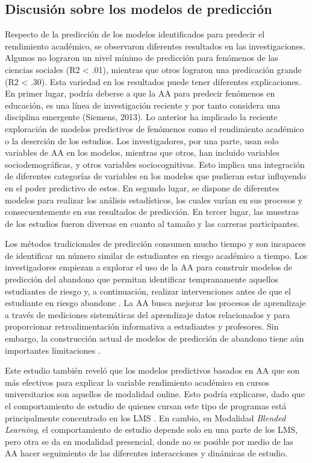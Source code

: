 \documentclass[spanish]{textolivre}
\begin{document}
\subsection*{Discusión sobre los modelos de predicción}
Respecto de la predicción de los modelos identificados para predecir el rendimiento académico, se observaron diferentes resultados en las investigaciones. Algunos no lograron un nivel mínimo de predicción para fenómenos de las ciencias sociales (R2 < .01), mientras que otros lograron una predicación grande (R2 < .30). Esta variedad en los resultados puede tener diferentes explicaciones. En primer lugar, podría deberse a que la AA para predecir fenómenos en educación, es una línea de investigación reciente y por tanto considera una disciplina emergente (Siemens, 2013). Lo anterior ha implicado la reciente exploración de modelos predictivos de fenómenos como el rendimiento académico o la deserción de los estudios. Los investigadores, por una parte, usan solo variables de AA en los modelos, mientras que otros, han incluido variables sociodemográficas, y otros variables sociocognitivas. Esto implica una integración de diferentes categorías de variables en los modelos que pudieran estar influyendo en el poder predictivo de estos. En segundo lugar, se dispone de diferentes modelos para realizar los análisis estadísticos, los cuales varían en sus procesos y consecuentemente en sus resultados de predicción. En tercer lugar, las muestras de los estudios fueron diversas en cuanto al tamaño y las carreras participantes.

Los métodos tradicionales de predicción consumen mucho tiempo y son incapaces de identificar un número similar de estudiantes en riesgo académico a tiempo. Los investigadores empiezan a explorar el uso de la AA para construir modelos de predicción del abandono que permitan identificar tempranamente aquellos estudiantes de riesgo y, a continuación, realizar intervenciones antes de que el estudiante en riesgo abandone \cite{zheng2020}. La AA busca mejorar los procesos de aprendizaje a través de mediciones sistemáticas del aprendizaje datos relacionados y para proporcionar retroalimentación informativa a estudiantes y profesores. Sin embargo, la construcción actual de modelos de predicción de abandono tiene aún importantes limitaciones \cite{zheng2020}.

Este estudio también reveló que los modelos predictivos basados en AA que son más efectivos para explicar la variable rendimiento académico en cursos universitarios son aquellos de modalidad online. Esto podría explicarse, dado que el comportamiento de estudio de quienes cursan este tipo de programas está principalmente concentrado en los LMS \cite{mubarak2021}. En cambio, en Modalidad \emph{Blended Learning}, el comportamiento de estudio depende solo en una parte de los LMS, pero otra se da en modalidad presencial, donde no es posible por medio de las AA hacer seguimiento de las diferentes interacciones y dinámicas de estudio.
\end{document}
